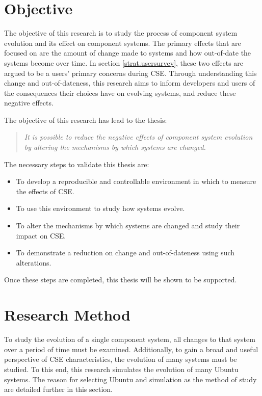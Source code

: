 \section{Objective}
The objective of this research is to study the process of component system evolution and its effect on component systems.
The primary effects that are focused on are the amount of change made to systems and how out-of-date the systems become over time.
In section \ref{strat.usersurvey}, these two effects are argued to be a users' primary concerns during CSE.
Through understanding this change and out-of-dateness,
this research aims to inform developers and users of the consequences their choices have on evolving systems,
and reduce these negative effects.

The objective of this research has lead to the thesis:
\begin{quote}
\textit{It is possible to reduce the negative effects of component system evolution by altering the mechanisms by which systems are changed.} 
\end{quote}

The necessary steps to validate this thesis are:
\begin{itemize}
  \item To develop a reproducible and controllable environment in which to measure the effects of CSE.
  \item To use this environment to study how systems evolve.
  \item To alter the mechanisms by which systems are changed and study their impact on CSE.
  \item To demonstrate a reduction on change and out-of-dateness using such alterations.
\end{itemize}

Once these steps are completed, this thesis will be shown to be supported.  

\section{Research Method}
To study the evolution of a single component system, all changes to that system over a period of time must be examined.
Additionally, to gain a broad and useful perspective of CSE characteristics, the evolution of many systems must be studied.
To this end, this research simulates the evolution of many Ubuntu systems.
The reason for selecting Ubuntu and simulation as the method of study are detailed further in this section.

